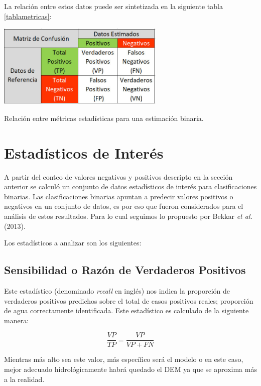 \documentclass[10pt,a4paper, twoside]{report}
\begin{document}
La relación entre estos datos puede ser sintetizada en la siguiente tabla \ref{tablametricas}:

\begin{table}[H]
   \centering      
   \includegraphics[width=0.6\textwidth]{imagenes/tablametricas.jpg}
 \caption{Relación entre métricas estadísticas para una estimación binaria.}
 \label{tablametricas}
\end{table}



\section{Estadísticos de Interés}

A partir del conteo de valores negativos y positivos descripto en la sección anterior se calculó un conjunto de datos estadísticos de interés para clasificaciones binarias.  Las clasificaciones binarias apuntan a predecir valores positivos o negativos en un conjunto de datos, es por eso que fueron considerados para el análisis de estos resultados. Para lo cual seguimos lo propuesto por Bekkar \textit{et al.} (2013).

Los estadísticos a analizar son los siguientes:

\subsection{Sensibilidad o Razón de Verdaderos Positivos}

Este estadístico (denominado \textit{recall} en inglés) nos indica la proporción de verdaderos positivos predichos sobre el total de casos positivos reales; proporción de agua correctamente identificada. Este estadístico es calculado de la siguiente manera: 

\begin{equation}
\frac{VP}{TP}=\frac{VP}{VP + FN}
\end{equation}

Mientras más alto sea este valor, más específico será el modelo o en este caso, mejor adecuado hidrológicamente habrá quedado el DEM ya que se aproxima más a la realidad.
\end{document}
